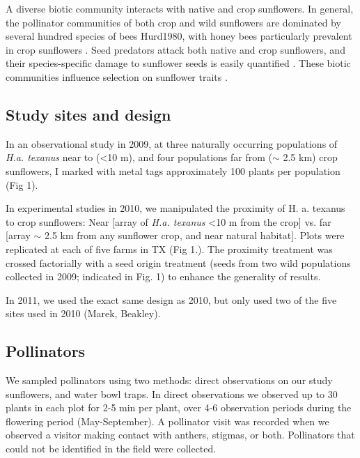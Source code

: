 \documentclass[12pt]{article}
\begin{document}
A diverse biotic community interacts with native and crop sunflowers. In general, the pollinator communities of both crop and wild sunflowers are dominated by several hundred species of bees Hurd1980, with honey bees particularly prevalent in crop sunflowers \cite{Greenleaf2006}. Seed predators attack both native and crop sunflowers, and their species-specific damage to sunflower seeds is easily quantified \citep{Whitney2006}. These biotic communities influence selection on sunflower traits \citep{Whitney2006}.

\subsection{Study sites and design}
In an observational study in 2009, at three naturally occurring populations of \textit{H.a. texanus} near to (\textless 10 m), and four populations far from ($\sim$ 2.5 km) crop sunflowers, I marked with metal tags approximately 100 plants per population (Fig 1).  

In experimental studies in 2010, we manipulated the proximity of H. a. texanus to crop sunflowers: Near [array of \textit{H.a. texanus} \textless 10 m from the crop] vs. far [array $\sim$ 2.5 km from any sunflower crop, and near natural habitat].  Plots were replicated at each of five farms in TX (Fig 1.).  The proximity treatment was crossed factorially with a seed origin treatment (seeds from two wild populations collected in 2009; indicated in Fig. 1) to enhance the generality of results.  
	
In 2011, we used the exact same design as 2010, but only used two of the five sites used in 2010 (Marek, Beakley).

\subsection{Pollinators}
We sampled pollinators using two methods: direct observations on our study sunflowers, and water bowl traps.  In direct observations we observed up to 30 plants in each plot for 2-5 min per plant, over 4-6 observation periods during the flowering period (May-September).  A pollinator visit was recorded when we observed a visitor making contact with anthers, stigmas, or both.  Pollinators that could not be identified in the field were collected.  
\end{document}
